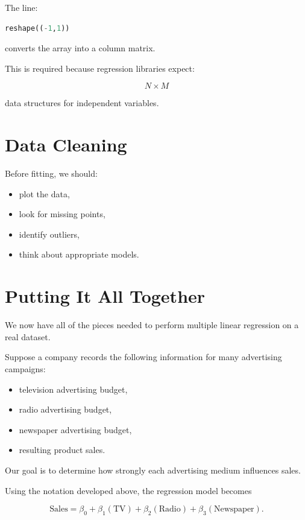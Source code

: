 \documentclass[11pt]{article}
\begin{document}
The line:

\begin{lstlisting}[language=Python]
reshape((-1,1))
\end{lstlisting}

converts the array into a column matrix.

This is required because regression libraries expect:

\[
N \times M
\]

data structures for independent variables.

\section{Data Cleaning}

Before fitting, we should:

\begin{itemize}
    \item plot the data,
    \item look for missing points,
    \item identify outliers,
    \item think about appropriate models.
\end{itemize}

\section{Putting It All Together}

We now have all of the pieces needed to perform multiple linear regression on
a real dataset.

Suppose a company records the following information for many advertising
campaigns:

\begin{itemize}
    \item television advertising budget,
    \item radio advertising budget,
    \item newspaper advertising budget,
    \item resulting product sales.
\end{itemize}

Our goal is to determine how strongly each advertising medium influences sales.

Using the notation developed above, the regression model becomes

\[
\text{Sales}
=
\beta_0
+
\beta_1(\text{TV})
+
\beta_2(\text{Radio})
+
\beta_3(\text{Newspaper}).
\]
\end{document}
